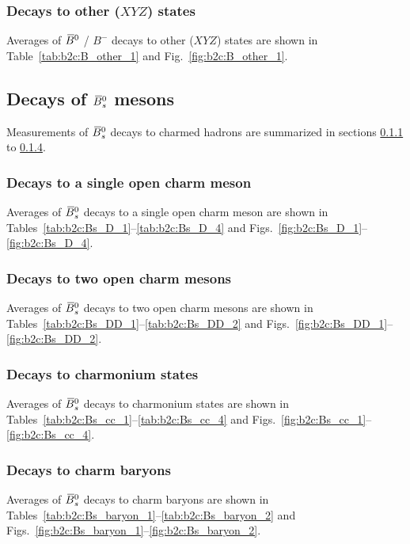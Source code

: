 \subsubsection{Decays to other ($XYZ$) states}
\label{sec:b2c:B_other}
Averages of $\kern 0.18em\overline{\kern -0.18em B}{}^0$ / $B^-$ decays to other ($XYZ$) states are shown in Table~\ref{tab:b2c:B_other_1} and Fig.~\ref{fig:b2c:B_other_1}.


\subsection{Decays of $\kern 0.18em\overline{\kern -0.18em B}{}_s^0$ mesons}
\label{sec:b2c:Bs}
Measurements of $\kern 0.18em\overline{\kern -0.18em B}{}_s^0$ decays to charmed hadrons are summarized in sections \ref{sec:b2c:Bs_D} to \ref{sec:b2c:Bs_baryon}.

\subsubsection{Decays to a single open charm meson}
\label{sec:b2c:Bs_D}
Averages of $\kern 0.18em\overline{\kern -0.18em B}{}_s^0$ decays to a single open charm meson are shown in Tables~\ref{tab:b2c:Bs_D_1}--\ref{tab:b2c:Bs_D_4} and Figs.~\ref{fig:b2c:Bs_D_1}--\ref{fig:b2c:Bs_D_4}.

\subsubsection{Decays to two open charm mesons}
\label{sec:b2c:Bs_DD}
Averages of $\kern 0.18em\overline{\kern -0.18em B}{}_s^0$ decays to two open charm mesons are shown in Tables~\ref{tab:b2c:Bs_DD_1}--\ref{tab:b2c:Bs_DD_2} and Figs.~\ref{fig:b2c:Bs_DD_1}--\ref{fig:b2c:Bs_DD_2}.

\subsubsection{Decays to charmonium states}
\label{sec:b2c:Bs_cc}
Averages of $\kern 0.18em\overline{\kern -0.18em B}{}_s^0$ decays to charmonium states are shown in Tables~\ref{tab:b2c:Bs_cc_1}--\ref{tab:b2c:Bs_cc_4} and Figs.~\ref{fig:b2c:Bs_cc_1}--\ref{fig:b2c:Bs_cc_4}.

\subsubsection{Decays to charm baryons}
\label{sec:b2c:Bs_baryon}
Averages of $\kern 0.18em\overline{\kern -0.18em B}{}_s^0$ decays to charm baryons are shown in Tables~\ref{tab:b2c:Bs_baryon_1}--\ref{tab:b2c:Bs_baryon_2} and Figs.~\ref{fig:b2c:Bs_baryon_1}--\ref{fig:b2c:Bs_baryon_2}.


